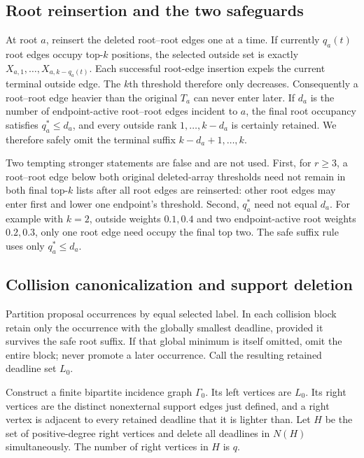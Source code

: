 \documentclass[11pt]{article}
\newcommand{\1}{\mathbf 1}
\begin{document}
\subsection{Root reinsertion and the two safeguards}

At root $a$, reinsert the deleted root--root edges one at a time.  If currently $q_a(t)$
root edges occupy top-$k$ positions, the selected outside set is exactly
$X_{a,1},\ldots,X_{a,k-q_a(t)}$.  Each successful root-edge insertion expels the current
terminal outside edge.  The $k$th threshold therefore only decreases.  Consequently a
root--root edge heavier than the original $T_a$ can never enter later.
If $d_a$ is the number of endpoint-active root--root edges incident to $a$, the final
root occupancy satisfies $q_a^*\le d_a$, and every outside rank
$1,\ldots,k-d_a$ is certainly retained.  We therefore safely omit the terminal suffix
$k-d_a+1,\ldots,k$.

Two tempting stronger statements are false and are not used.  First, for $r\ge3$, a
root--root edge below both original deleted-array thresholds need not remain in both final
top-$k$ lists after all root edges are reinserted: other root edges may enter first and
lower one endpoint's threshold.  Second, $q_a^*$ need not equal $d_a$.  For example with
$k=2$, outside weights $0.1,0.4$ and two endpoint-active root weights $0.2,0.3$, only one
root edge need occupy the final top two.  The safe suffix rule uses only $q_a^*\le d_a$.

\subsection{Collision canonicalization and support deletion}

Partition proposal occurrences by equal selected label.  In each collision block retain
only the occurrence with the globally smallest deadline, provided it survives the safe
root suffix.  If that global minimum is itself omitted, omit the entire block; never
promote a later occurrence.  Call the resulting retained deadline set $L_0$.

Construct a finite bipartite incidence graph $\Gamma_0$.  Its left vertices are $L_0$.
Its right vertices are the distinct nonexternal support edges just defined, and a right
vertex is adjacent to every retained deadline that it is lighter than.  Let $H$ be the
set of positive-degree right vertices and delete all deadlines in $N(H)$ simultaneously.
The number of right vertices in $H$ is $q$.
\end{document}
